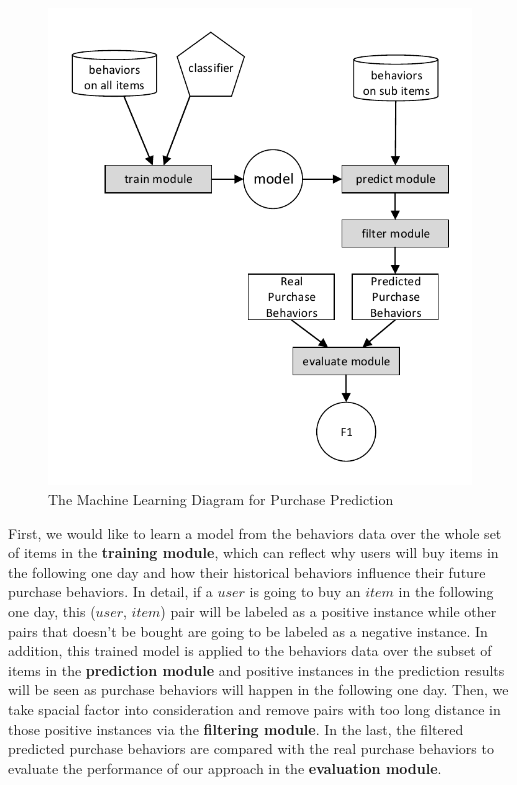 \documentclass{llncs}
\begin{document}
\begin{figure}[htbp]
	\centering
	\includegraphics[scale=0.6]{images/system.pdf}
	\caption{The Machine Learning Diagram for Purchase Prediction}
	\label{fig:framework}
\end{figure}

First, we would like to learn a model from
the behaviors data over the whole set of items in the \textbf{training module},
which can reflect why users will buy items in the following one day
and how their historical behaviors influence their future purchase behaviors.
In detail, if a $user$ is going to buy an $item$ in the following one day,
this ($user$, $item$) pair will be labeled as a positive instance
while other pairs that doesn't be bought
are going to be labeled as a negative instance.
In addition, this trained model is applied to the behaviors data over
the subset of items in the \textbf{prediction module}
and positive instances in the prediction results will be seen as
purchase behaviors will happen in the following one day.
Then, we take spacial factor into consideration and remove pairs
with too long distance in those positive instances
via the \textbf{filtering module}.
In the last, the filtered predicted purchase behaviors are
compared with the real purchase behaviors to evaluate
the performance of our approach in the \textbf{evaluation module}.
\end{document}
